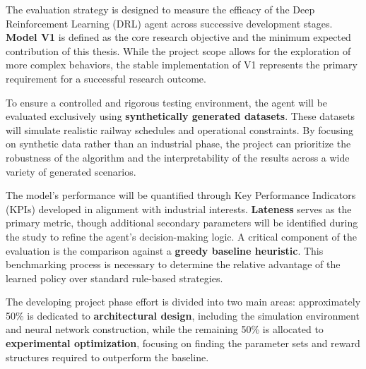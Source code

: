 \documentclass[a4paper]{scrartcl}
\begin{document}
The evaluation strategy is designed to measure the efficacy of the Deep Reinforcement Learning (DRL) agent across successive development stages. \textbf{Model V1} is defined as the core research objective and the minimum expected contribution of this thesis. While the project scope allows for the exploration of more complex behaviors, the stable implementation of V1 represents the primary requirement for a successful research outcome.

To ensure a controlled and rigorous testing environment, the agent will be evaluated exclusively using \textbf{synthetically generated datasets}. These datasets will simulate realistic railway schedules and operational constraints. By focusing on synthetic data rather than an industrial phase, the project can prioritize the robustness of the algorithm and the interpretability of the results across a wide variety of generated scenarios.

The model's performance will be quantified through Key Performance Indicators (KPIs) developed in alignment with industrial interests. \textbf{Lateness} serves as the primary metric, though additional secondary parameters will be identified during the study to refine the agent's decision-making logic. A critical component of the evaluation is the comparison against a \textbf{greedy baseline heuristic}. This benchmarking process is necessary to determine the relative advantage of the learned policy over standard rule-based strategies.

The developing project phase effort is divided into two main areas: approximately 50\% is dedicated to \textbf{architectural design}, including the simulation environment and neural network construction, while the remaining 50\% is allocated to \textbf{experimental optimization}, focusing on finding the parameter sets and reward structures required to outperform the baseline.
\end{document}
